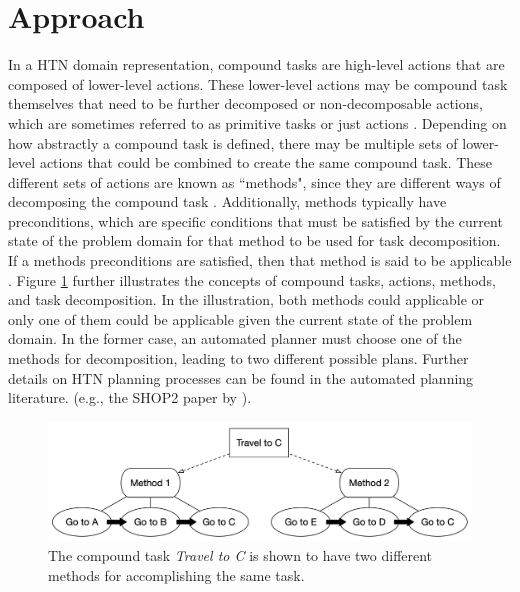 \section{Approach}
In a HTN domain representation, compound tasks are high-level actions that are composed of lower-level actions. These lower-level actions may be compound task themselves that need to be further decomposed or non-decomposable actions, which are sometimes referred to as primitive tasks or just actions \citep{Russell_Norvig_2021}. Depending on how abstractly a compound task is defined, there may be multiple sets of lower-level actions that could be combined to create the same compound task. These different sets of actions are known as ``methods", since they are different ways of decomposing the compound task \citep{Russell_Norvig_2021}. Additionally, methods typically have preconditions, which are specific conditions that must be satisfied by the current state of the problem domain for that method to be used for task decomposition. If a methods preconditions are satisfied, then that method is said to be applicable \citep{Russell_Norvig_2021}. Figure \ref{pr_fig:1} further illustrates the concepts of compound tasks, actions, methods, and task decomposition. In the illustration, both methods could applicable or only one of them could be applicable given the current state of the problem domain. In the former case, an automated planner must choose one of the methods for decomposition, leading to two different possible plans. Further details on HTN planning processes can be found in the automated planning literature. (e.g., the SHOP2 paper by \citet{Nau_2003}). 

\begin{figure}[h]
    \centering
    \includegraphics[width=1\textwidth]{images/htn_concepts}
    \caption{The compound task \textit{Travel to C} is shown to have two different methods for accomplishing the same task.} 
    \label{pr_fig:1}
\end{figure}

